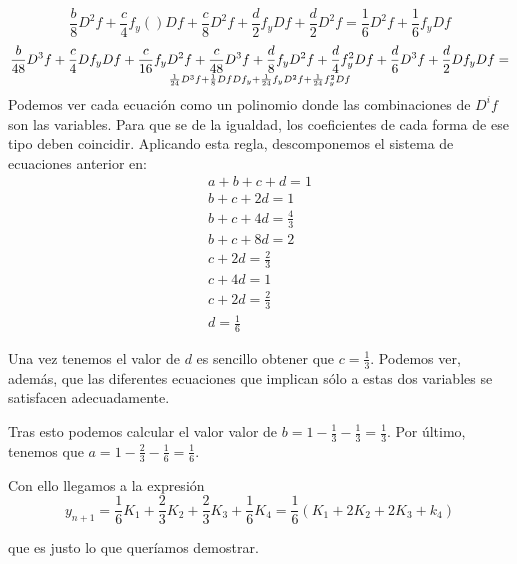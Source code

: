 \documentclass[nochap]{apuntes}
\begin{document}
\[\frac{b}{8}D^2f +\frac{c}{4}f_y()Df+\frac{c}{8}D^2f + \frac{d}{2}f_yDf+\frac{d}{2}D^2f= \frac{1}{6}D^2f+\frac{1}{6}f_yDf \]
\[\frac{b}{48}D^3f + \frac{c}{4}Df_yDf+\frac{c}{16}f_yD^2f+\frac{c}{48}D^3f+\frac{d}{8}f_yD^2f + \frac{d}{4}f_y^2Df+\frac{d}{6}D^3f+\frac{d}{2}Df_yDf= \atop\frac{1}{24}D^3f+\frac{1}{8}DfDf_y+\frac{1}{24}f_yD^2f+\frac{1}{24}f_y^2Df\]
\normalsize
Podemos ver cada ecuación como un polinomio donde las combinaciones de $D^if$ son las variables. Para que se de la igualdad, los coeficientes de cada forma de ese tipo deben coincidir. Aplicando esta regla, descomponemos el sistema de ecuaciones anterior en:
\[\begin{array}{l}
a+b+c+d=1\\
b+c+2d = 1\\
b+c+4d=\frac{4}{3} \\
b+c+8d = 2\\
c+2d = \frac{2}{3}\\
c+4d = 1 \\
c +2d = \frac{2}{3} \\
d = \frac{1}{6}
\end{array}\]

Una vez tenemos el valor de $d$ es sencillo obtener que $c=\frac{1}{3}$. Podemos ver, además, que las diferentes ecuaciones que implican sólo a estas dos variables se satisfacen adecuadamente.

Tras esto podemos calcular el valor valor de $b = 1 - \frac{1}{3}-\frac{1}{3} = \frac{1}{3}$. Por último, tenemos que $a = 1-\frac{2}{3}-\frac{1}{6} = \frac{1}{6}$.

Con ello llegamos a la expresión
\[y_{n+1} = \frac{1}{6}K_1+\frac{2}{3}K_2+\frac{2}{3}K_3+\frac{1}{6}K_4 = \frac{1}{6}(K_1+2K_2+2K_3+k_4)\]

que es justo lo que queríamos demostrar.
\end{document}
